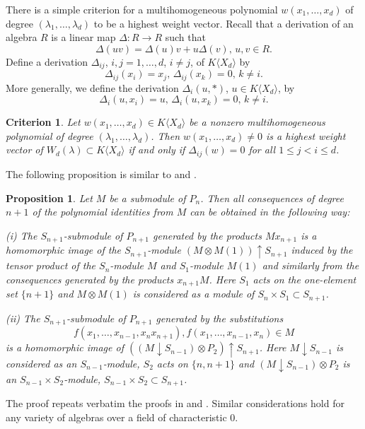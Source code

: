 \documentclass{amsart}
\newtheorem{proposition}[theorem]{Proposition}
\newtheorem{criterion}[theorem]{Criterion}
\theoremstyle{definition}
\begin{document}
There is a simple criterion for a multihomogeneous polynomial  $w(x_1,\ldots,x_d)$ of degree $(\lambda_1,\ldots,\lambda_d)$
to be a highest weight vector. Recall that a derivation of an algebra $R$ is a linear map $\Delta:R\to R$ such that
\[
\Delta(uv)=\Delta(u)v+u\Delta(v),\, u,v\in R.
\]
Define a derivation $\Delta_{ij}$, $i,j=1,\ldots,d$, $i\not=j$, of $K\langle X_d\rangle$ by
\[
\Delta_{ij}(x_i)=x_j,\,\Delta_{ij}(x_k)=0,\,k\not=i.
\]
More generally, we define the derivation $\Delta_i(u,\ast)$, $u\in K\langle X_d\rangle$, by
\[
\Delta_i(u,x_i)=u,\,\Delta_i(u,x_k)=0,\,k\not=i.
\]

\begin{criterion}\label{criterion hwv}
Let $w(x_1,\ldots,x_d)\in K\langle X_d\rangle$ be a nonzero multihomogeneous polynomial of degree $(\lambda_1,\ldots,\lambda_d)$.
Then $w(x_1,\ldots,x_d)\not=0$ is a highest weight vector of $W_d(\lambda)\subset K\langle X_d\rangle$ if and only if
$\Delta_{ij}(w)=0$ for all $1\leq j<i\leq d$.
\end{criterion}

The following proposition is similar to \cite[Lemma 2.5]{Dr2} and \cite[Proposition 1]{DrK}.

\begin{proposition}\label{consequences of degree n+1}
Let $M$ be a submodule of $P_n$. Then all consequences of degree $n+1$ of the polynomial identities from $M$ can be obtained in the following way:

{\rm (i)} The $S_{n+1}$-submodule of $P_{n+1}$ generated by the products $Mx_{n+1}$ is a homomorphic image of the $S_{n+1}$-module $(M\otimes M(1))\uparrow S_{n+1}$
induced by the tensor product of the $S_n$-module $M$ and $S_1$-module $M(1)$ and similarly from the consequences generated by the products $x_{n+1}M$.
Here $S_1$ acts on the one-element set $\{n+1\}$ and $M\otimes M(1)$ is considered as a module of $S_n\times S_1\subset S_{n+1}$.

{\rm (ii)} The $S_{n+1}$-submodule of $P_{n+1}$ generated by the substitutions
\[
f(x_1,\ldots,x_{n-1},x_nx_{n+1}), f(x_1,\ldots,x_{n-1},x_n)\in M
\]
is a homomorphic image of $((M\downarrow S_{n-1})\otimes P_2)\uparrow S_{n+1}$. Here $M\downarrow S_{n-1}$ is considered as an $S_{n-1}$-module, $S_2$ acts on $\{n,n+1\}$ and
$(M\downarrow S_{n-1})\otimes P_2$ is an $S_{n-1}\times S_2$-module, $S_{n-1}\times S_2\subset S_{n+1}$.
\end{proposition}

The proof repeats verbatim the proofs in \cite{Dr2} and \cite{DrK}.
Similar considerations hold for any variety of algebras over a field of characteristic 0.
\end{document}
